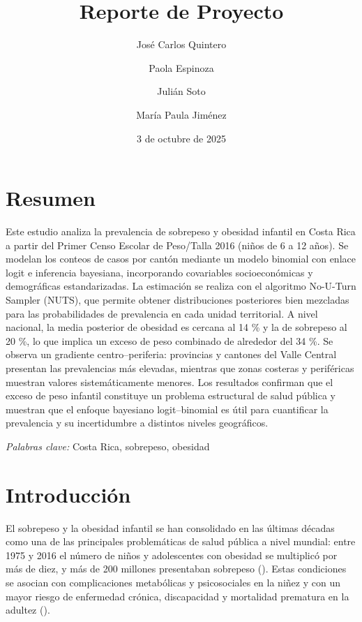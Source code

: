 \documentclass[
]{article}
\title{Reporte de Proyecto}
\author{José Carlos Quintero \and Paola Espinoza \and Julián
Soto \and María Paula Jiménez}
\date{3 de octubre de 2025}
\begin{document}
\maketitle

{
\setcounter{tocdepth}{2}
\tableofcontents
}
\section{Resumen}\label{resumen}

Este estudio analiza la prevalencia de sobrepeso y obesidad infantil en
Costa Rica a partir del Primer Censo Escolar de Peso/Talla 2016 (niños
de 6 a 12 años). Se modelan los conteos de casos por cantón mediante un
modelo binomial con enlace logit e inferencia bayesiana, incorporando
covariables socioeconómicas y demográficas estandarizadas. La estimación
se realiza con el algoritmo No-U-Turn Sampler (NUTS), que permite
obtener distribuciones posteriores bien mezcladas para las
probabilidades de prevalencia en cada unidad territorial. A nivel
nacional, la media posterior de obesidad es cercana al 14 \% y la de
sobrepeso al 20 \%, lo que implica un exceso de peso combinado de
alrededor del 34 \%. Se observa un gradiente centro--periferia:
provincias y cantones del Valle Central presentan las prevalencias más
elevadas, mientras que zonas costeras y periféricas muestran valores
sistemáticamente menores. Los resultados confirman que el exceso de peso
infantil constituye un problema estructural de salud pública y muestran
que el enfoque bayesiano logit--binomial es útil para cuantificar la
prevalencia y su incertidumbre a distintos niveles geográficos.

\emph{Palabras clave:} Costa Rica, sobrepeso, obesidad

\section{Introducción}\label{introducciuxf3n}

El sobrepeso y la obesidad infantil se han consolidado en las últimas
décadas como una de las principales problemáticas de salud pública a
nivel mundial: entre 1975 y 2016 el número de niños y adolescentes con
obesidad se multiplicó por más de diez, y más de 200 millones
presentaban sobrepeso (). Estas condiciones se asocian con complicaciones metabólicas y
psicosociales en la niñez y con un mayor riesgo de enfermedad crónica,
discapacidad y mortalidad prematura en la adultez
().
\end{document}
